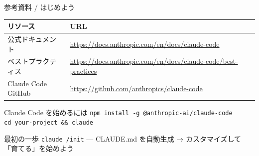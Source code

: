 \documentclass[aspectratio=169, 14pt]{beamer}
\begin{document}
\begin{frame}{参考資料 / はじめよう}
  \begin{table}
    \centering\small
    \begin{tabular}{lp{55mm}}
      \hline
      \textbf{リソース} & \textbf{URL} \\
      \hline
      公式ドキュメント &
        \url{https://docs.anthropic.com/en/docs/claude-code} \\
      ベストプラクティス &
        \url{https://docs.anthropic.com/en/docs/claude-code/best-practices} \\
      Claude Code GitHub &
        \url{https://github.com/anthropics/claude-code} \\
      \hline
    \end{tabular}
  \end{table}

  \vspace{0.5em}

  \begin{exampleblock}{Claude Code を始めるには}
    {\small
    \texttt{npm install -g @anthropic-ai/claude-code} \\
    \texttt{cd your-project \&\& claude}
    }
  \end{exampleblock}

  \vspace{0.3em}

  \begin{block}{最初の一歩}
    {\small
    \texttt{claude /init} — CLAUDE.md を自動生成 → カスタマイズして「育てる」を始めよう
    }
  \end{block}
\end{frame}

\end{document}
